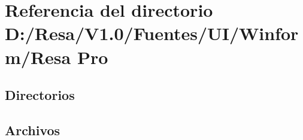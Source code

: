 \section{Referencia del directorio D\+:/\+Resa/\+V1.0/\+Fuentes/\+U\+I/\+Winform/\+Resa Pro}
\label{dir_76d961be6f7d9b32a1f99df4887779c7}
\subsection*{Directorios}
\begin{DoxyCompactItemize}
\end{DoxyCompactItemize}
\subsection*{Archivos}
\begin{DoxyCompactItemize}
\end{DoxyCompactItemize}
